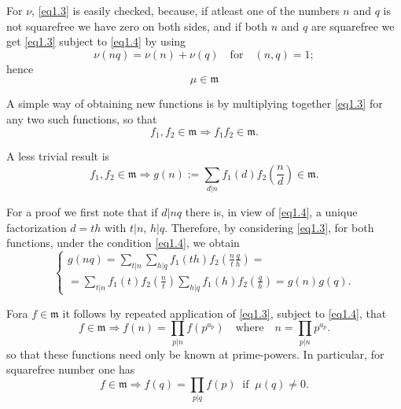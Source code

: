 For $\nu$, \eqref{eq1.3} is easily checked, because, if atleast one of the
numbers $n$ and $q$ is not squarefree we have zero on both sides, and
if both $n$ and $q$ are squarefree we get \eqref{eq1.3} subject to
\eqref{eq1.4} by using  
\begin{equation*}%
\nu(nq)=\nu(n) + \nu(q)\quad \text{for}\quad  (n,q)=1;
\tag{1.10}\label{eq1.10} 
\end{equation*}
hence 
\begin{equation*} %
\mu \in \mathfrak{m} \tag{1.11}\label{eq1.11}
\end{equation*}

A simple way of obtaining new functions is by multiplying together
\eqref{eq1.3} for any two such functions, so that  
\begin{equation*} %
f_1,f_2\in \mathfrak{m}\Rightarrow
f_1f_2 \in \mathfrak{m}. \tag{1.12}\label{eq1.12} 
\end{equation*}

A less trivial result is 
\begin{equation*}%
f_1,f_2 \in \mathfrak{m}\Rightarrow g(n):=
\sum_{d|n}f_1(d)f_2(\frac{n}{d})\in
\mathfrak{m}. \tag{1.13}\label{eq1.13} 
\end{equation*}

For a proof we first note that if $d|nq$ there is, in view of
\eqref{eq1.4}, a unique factorization $d=th$ with $t|n$, $h|q$.
Therefore, by considering \eqref{eq1.3}, for both functions, under the
condition \eqref{eq1.4}, we obtain   
\begin{equation*}%
\begin{cases}
g(nq)=\sum\limits_{t|n}\sum\limits_{h|q}f_1(th)f_2(\frac{n}{t}\frac{q}{h}) =\\
= \sum\limits_{t|n}f_1(t) f_2(\frac{n}{t})  \sum\limits_{h|q}f_1(h) f_2(\frac{q}{h})=g(n) g(q). 
\end{cases} \tag{1.14}\label{eq1.14}
\end{equation*}

For\pageoriginale a $f\in \mathfrak{m}$ it follows by repeated
application of \eqref{eq1.3}, subject to \eqref{eq1.4}, that  
\begin{equation*}%
f \in \mathfrak{m}\Rightarrow f(n)=\prod_{p|n} f(p^{a_p})\quad
\text{where}\quad n = \prod_{p|n} p^{a_p}. \tag{1.15}\label{eq1.15} 
\end{equation*}
so that these functions need only be known at prime-powers. In
particular, for squarefree  number one has  
\begin{equation*}%
f \in \mathfrak{m}\Rightarrow f(q)=\prod_{p|q} f(p) ~\text{ if }~ \mu (q)\neq
0. \tag{1.16}\label{eq1.16} 
\end{equation*}


